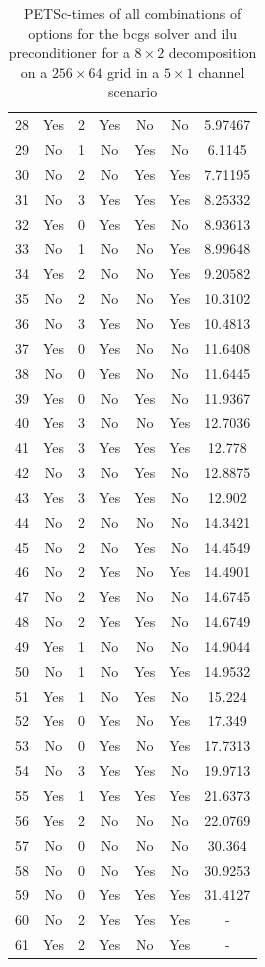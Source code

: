 \begin{table}[h]
\begin{tabular}{ccccccc}
    28 & Yes & 2 & Yes & No & No & 5.97467 \\
    29 & No & 1 & No & Yes & No & 6.1145 \\
    30 & No & 2 & No & Yes & Yes & 7.71195 \\
    31 & No & 3 & Yes & Yes & Yes & 8.25332 \\
    32 & Yes & 0 & Yes & Yes & No & 8.93613 \\
    33 & No & 1 & No & No & Yes & 8.99648 \\
    34 & Yes & 2 & No & No & Yes & 9.20582 \\
    35 & No & 2 & No & No & Yes & 10.3102 \\
    36 & No & 3 & Yes & No & Yes & 10.4813 \\
    37 & Yes & 0 & Yes & No & No & 11.6408 \\
    38 & No & 0 & Yes & No & No & 11.6445 \\
    39 & Yes & 0 & No & Yes & No & 11.9367 \\
    40 & Yes & 3 & No & No & Yes & 12.7036 \\
    41 & Yes & 3 & Yes & Yes & Yes & 12.778 \\
    42 & No & 3 & No & Yes & No & 12.8875 \\
    43 & Yes & 3 & Yes & Yes & No & 12.902 \\
    44 & No & 2 & No & No & No & 14.3421 \\
    45 & No & 2 & No & Yes & No & 14.4549 \\
    46 & No & 2 & Yes & No & Yes & 14.4901 \\
    47 & No & 2 & Yes & No & No & 14.6745 \\
    48 & No & 2 & Yes & Yes & No & 14.6749 \\
    49 & Yes & 1 & No & No & No & 14.9044 \\
    50 & No & 1 & No & Yes & Yes & 14.9532 \\
    51 & Yes & 1 & No & Yes & No & 15.224 \\
    52 & Yes & 0 & Yes & No & Yes & 17.349 \\
    53 & No & 0 & Yes & No & Yes & 17.7313 \\
    54 & No & 3 & Yes & Yes & No & 19.9713 \\
    55 & Yes & 1 & Yes & Yes & Yes & 21.6373 \\
    56 & Yes & 2 & No & No & No & 22.0769 \\
    57 & No & 0 & No & No & No & 30.364 \\
    58 & No & 0 & No & Yes & No & 30.9253 \\
    59 & No & 0 & Yes & Yes & Yes & 31.4127 \\
    \hline
    60 & No & 2 & Yes & Yes & Yes & - \\
    61 & Yes & 2 & Yes & No & Yes & - \\
    \hline
  \end{tabular}
  \caption{PETSc-times of all combinations of options for the bcgs solver and ilu preconditioner for a $8 \times 2$ decomposition on a $256 \times 64$ grid in a $5 \times 1$ channel scenario}
  \label{fig:petsc-opt-bcgs-8x2}
\end{table}

